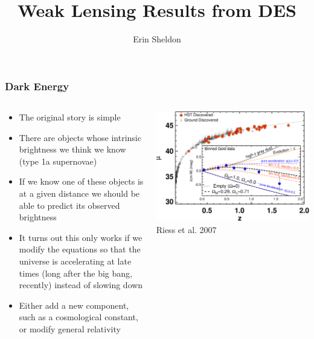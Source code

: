 \documentclass{beamer}
\title{Weak Lensing Results from DES}
\author{Erin Sheldon}
\institute{Brookhaven National Laboratory}
\begin{document}


\frame
{
    \frametitle{Dark Energy}

    \fontsize{9}{0.8\baselineskip}
    \begin{columns}
        \begin{column}{0.5\textwidth}    
            \begin{itemize}
                \item The original story is simple

                \item There are objects whose intrinsic brightness we think we
                    know (type 1a supernovae)

                \item If we know one of these objects is at a given distance we
                    should be able to predict its observed brightness

                \item It turns out this only works if we modify the equations
                    so that the universe is accelerating at late times (long
                    after the big bang, recently) instead of slowing down

                \item Either add a new component, such as a cosmological constant,
                    or modify general relativity

            \end{itemize}
        \end{column}
        \begin{column}{0.5\textwidth}
            \begin{center}
                \includegraphics[width=\textwidth]{riess-distmodulus.pdf}
                \newline
                Riess et al. 2007
            \end{center}
        \end{column}
    \end{columns}
}
\end{document}
